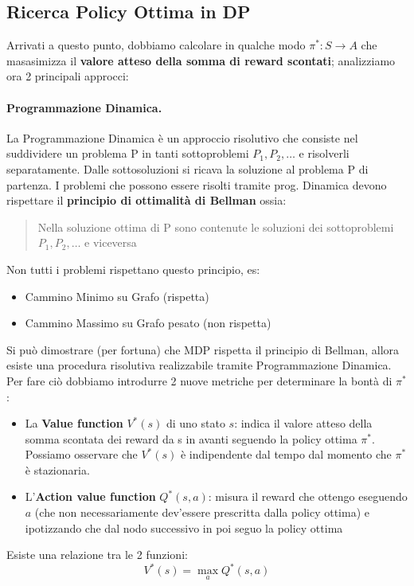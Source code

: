 \subsection{Ricerca Policy Ottima in DP}
Arrivati a questo punto, dobbiamo calcolare in qualche modo $\pi^* : S \rightarrow A$ che masasimizza il \textbf{valore atteso
della somma di reward scontati}; analizziamo ora 2 principali approcci:
\paragraph{Programmazione Dinamica.}La Programmazione Dinamica è un approccio risolutivo che consiste nel suddividere un problema
P in tanti sottoproblemi $P_1,P_2,\dots$ e risolverli separatamente. Dalle sottosoluzioni si ricava la soluzione al problema P di partenza.
I problemi che possono essere risolti tramite prog. Dinamica devono rispettare il \textbf{principio di ottimalità di Bellman} ossia:
\begin{quotation}
    Nella soluzione ottima di P sono contenute le soluzioni dei sottoproblemi $P_1,P_2,\dots$ e viceversa
\end{quotation}
Non tutti i problemi rispettano questo principio, es:
\begin{itemize}
    \item Cammino Minimo su Grafo (rispetta)
    \item Cammino Massimo su Grafo pesato (non rispetta)
\end{itemize}
Si può dimostrare (per fortuna) che MDP rispetta il principio di Bellman, allora esiste una procedura risolutiva realizzabile tramite Programmazione Dinamica.
Per fare ciò dobbiamo introdurre 2 nuove metriche per determinare la bontà di $\pi^*$:
\begin{itemize}
    \item La \textbf{Value function} $V^*(s)$ di uno stato $s$: indica il valore atteso della somma scontata dei reward da s in avanti
    seguendo la policy ottima $\pi^*$. Possiamo osservare che $V^*(s)$ è indipendente dal tempo dal momento che $\pi^*$ è stazionaria.
    \item L'\textbf{Action value function} $Q^*(s,a)$: misura il reward che ottengo eseguendo $a$ (che non necessariamente dev'essere
    prescritta dalla policy ottima) e ipotizzando che dal nodo successivo in poi seguo la policy ottima
\end{itemize}
Esiste una relazione tra le 2 funzioni:
\begin{equation}
    V^*(s) = \max_a Q^*(s,a)
\end{equation}

